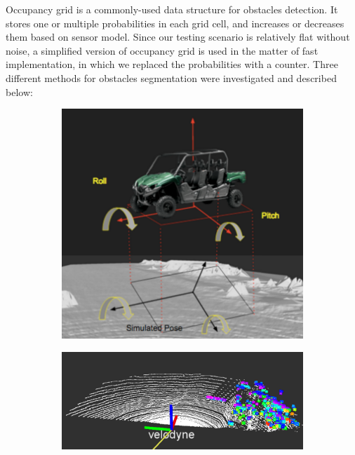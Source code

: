 \documentclass[../thesis.tex]{subfiles}
\begin{document}
Occupancy grid is a commonly-used data structure for obstacles detection. It stores one or multiple probabilities in each grid cell, and increases or decreases them based on sensor model. Since our testing scenario is relatively flat without noise, a simplified version of occupancy grid is used in the matter of fast implementation, in which we replaced the probabilities with a counter. Three different methods for obstacles segmentation were investigated and described below:

\begin{figure}[t]
	\centering
	\begin{subfigure}[b]{0.3\linewidth}
		\includegraphics[width=\columnwidth]{./RRTPlanner/fig/mesh.png}
		\label{fig:collision_mesh}
	\end{subfigure}
	\begin{subfigure}[b]{0.3\linewidth}
		\includegraphics[width=\columnwidth]{./RRTPlanner/fig/ransac.png}

\end{subfigure}
\end{figure}
\end{document}
